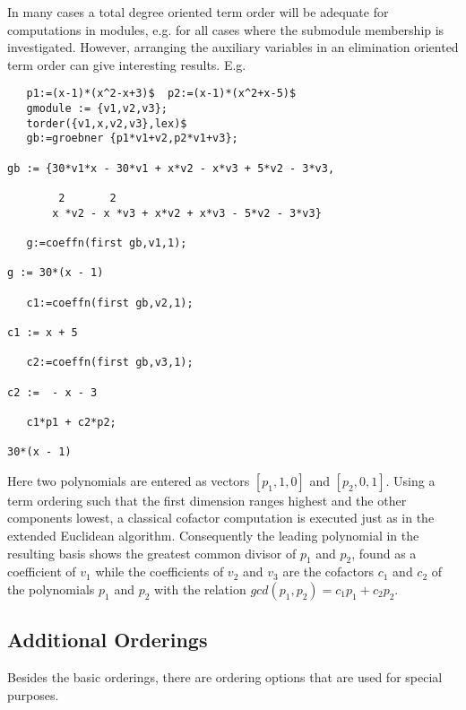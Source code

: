 In many cases a total degree oriented term order will be adequate
for computations in modules, e.g. for all cases where the
submodule membership is investigated. However, arranging
the auxiliary variables in an elimination oriented term order
can give interesting results. E.g.
\begin{verbatim}
   p1:=(x-1)*(x^2-x+3)$  p2:=(x-1)*(x^2+x-5)$
   gmodule := {v1,v2,v3};
   torder({v1,x,v2,v3},lex)$
   gb:=groebner {p1*v1+v2,p2*v1+v3};

gb := {30*v1*x - 30*v1 + x*v2 - x*v3 + 5*v2 - 3*v3,

        2       2
       x *v2 - x *v3 + x*v2 + x*v3 - 5*v2 - 3*v3}

   g:=coeffn(first gb,v1,1);

g := 30*(x - 1)

   c1:=coeffn(first gb,v2,1);

c1 := x + 5

   c2:=coeffn(first gb,v3,1);

c2 :=  - x - 3

   c1*p1 + c2*p2;

30*(x - 1)

\end{verbatim}
Here two polynomials
are entered as vectors $[p_1,1,0]$ and $[p_2,0,1]$. Using a term
ordering such that the first dimension ranges highest and the
other components lowest, a classical cofactor computation is
executed just as in the extended Euclidean algorithm.
Consequently the leading polynomial in the resulting
basis shows the greatest common divisor of $p_1$ and $p_2$,
found as a coefficient of $v_1$ while the coefficients
of $v_2$ and $v_3$ are the cofactors $c_1$ and $c_2$ of the polynomials
$p_1$ and $p_2$ with the relation $gcd(p_1,p_2) = c_1p_1 + c_2p_2$.

\subsection{Additional Orderings}
Besides the basic orderings, there are ordering options that are used for
special purposes.

